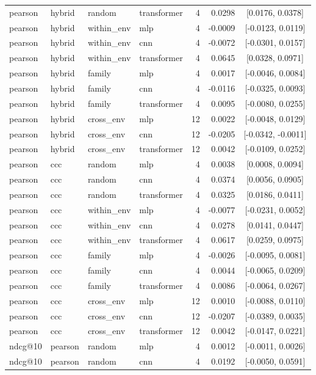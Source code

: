 \begin{longtable}{llllrrc}
pearson & hybrid & random & transformer & 4 & 0.0298 & [0.0176, 0.0378] \\
pearson & hybrid & within\_env & mlp & 4 & -0.0009 & [-0.0123, 0.0119] \\
pearson & hybrid & within\_env & cnn & 4 & -0.0072 & [-0.0301, 0.0157] \\
pearson & hybrid & within\_env & transformer & 4 & 0.0645 & [0.0328, 0.0971] \\
pearson & hybrid & family & mlp & 4 & 0.0017 & [-0.0046, 0.0084] \\
pearson & hybrid & family & cnn & 4 & -0.0116 & [-0.0325, 0.0093] \\
pearson & hybrid & family & transformer & 4 & 0.0095 & [-0.0080, 0.0255] \\
pearson & hybrid & cross\_env & mlp & 12 & 0.0022 & [-0.0048, 0.0129] \\
pearson & hybrid & cross\_env & cnn & 12 & -0.0205 & [-0.0342, -0.0011] \\
pearson & hybrid & cross\_env & transformer & 12 & 0.0042 & [-0.0109, 0.0252] \\
pearson & ccc & random & mlp & 4 & 0.0038 & [0.0008, 0.0094] \\
pearson & ccc & random & cnn & 4 & 0.0374 & [0.0056, 0.0905] \\
pearson & ccc & random & transformer & 4 & 0.0325 & [0.0186, 0.0411] \\
pearson & ccc & within\_env & mlp & 4 & -0.0077 & [-0.0231, 0.0052] \\
pearson & ccc & within\_env & cnn & 4 & 0.0278 & [0.0141, 0.0447] \\
pearson & ccc & within\_env & transformer & 4 & 0.0617 & [0.0259, 0.0975] \\
pearson & ccc & family & mlp & 4 & -0.0026 & [-0.0095, 0.0081] \\
pearson & ccc & family & cnn & 4 & 0.0044 & [-0.0065, 0.0209] \\
pearson & ccc & family & transformer & 4 & 0.0086 & [-0.0064, 0.0267] \\
pearson & ccc & cross\_env & mlp & 12 & 0.0010 & [-0.0088, 0.0110] \\
pearson & ccc & cross\_env & cnn & 12 & -0.0207 & [-0.0389, 0.0035] \\
pearson & ccc & cross\_env & transformer & 12 & 0.0042 & [-0.0147, 0.0221] \\
ndcg@10 & pearson & random & mlp & 4 & 0.0012 & [-0.0011, 0.0026] \\
ndcg@10 & pearson & random & cnn & 4 & 0.0192 & [-0.0050, 0.0591] \\

\end{longtable}
